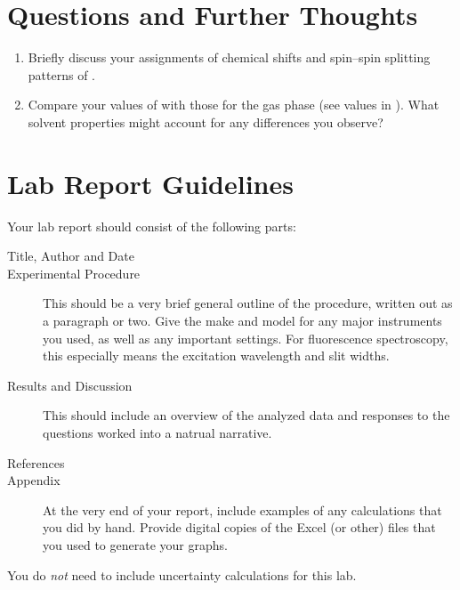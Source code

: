 \documentclass[nobib,nofonts,nols,nohyper]{tufte-handout}
\begin{document}

\section{Questions and Further Thoughts} %
\label{sec:questions_and_further_thoughts}

\begin{enumerate}
	\item Briefly discuss your assignments of chemical shifts and spin--spin splitting patterns of . 
	\item Compare your values of  with those for the gas phase (see values in \textcite{jarek97nmr}).
	What solvent properties might account for any differences you observe?
\end{enumerate}


\section{Lab Report Guidelines} %
\label{sec:lab_report_guidelines}

Your lab report should consist of the following parts:
\begin{description}
	\item[Title, Author and Date]
	\item[Experimental Procedure] This should be a very brief general outline of the procedure, written out as a paragraph or two. Give the make and model for any major instruments you used, as well as any important settings. For fluorescence spectroscopy, this especially means the excitation wavelength and slit widths.
	\item[Results and Discussion] This should include an overview of the analyzed data and responses to the questions worked into a natrual narrative.
	\item[References]
	\item[Appendix] At the very end of your report, include examples of any calculations that you did by hand. 
	Provide digital copies of the Excel (or other) files that you used to generate your graphs.
\end{description}

\noindent You do \emph{not} need to include uncertainty calculations for this lab. 


\nocite{*}
\printbibliography[category=cited]%

\printbibliography[%
  title={Further Reading},%
  resetnumbers,%
  omitnumbers,%
	notcategory=cited,%
	]
\end{document}
